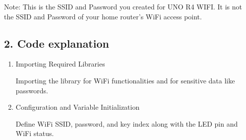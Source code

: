 \documentclass[a4paper,11pt,english]{sphinxmanual}
\begin{document}
\sphinxAtStartPar
Note: This is the SSID and Password you created for UNO R4 WIFI. It is not the SSID and Password of your home router’s WiFi access point.



\subsection{2. Code explanation}
\label{\detokenize{Extension_Project/Web_Control_LED:code-explanation}}\begin{enumerate}
%
\item {} 
\sphinxAtStartPar
Importing Required Libraries

\sphinxAtStartPar
Importing the  library for WiFi functionalities and  for sensitive data like passwords.

\begin{sphinxVerbatim}[commandchars=\\\{\}]
\end{sphinxVerbatim}

\item {} 
\sphinxAtStartPar
Configuration and Variable Initialization

\sphinxAtStartPar
Define WiFi SSID, password, and key index along with the LED pin and WiFi status.

\begin{sphinxVerbatim}[commandchars=\\\{\}]
\PYG{p}{[}\PYG{p}{]}
\PYG{p}{[}\PYG{p}{]}
\end{sphinxVerbatim}


\end{enumerate}
\end{document}

